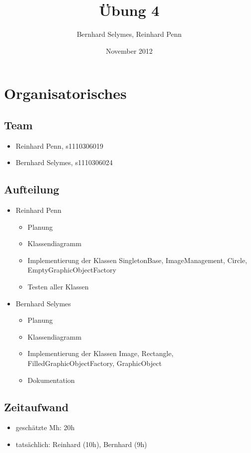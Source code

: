 \documentclass[12pt,a4paper]{article}
\begin{document}
\title{Übung 4}
\author{Bernhard Selymes, Reinhard Penn}
\date{November 2012}

\normalsize

\newcommand{\CodePath}{../ImageManagment/ImageManagment/}

\section{Organisatorisches}

\subsection{Team}
	\begin {itemize} 
		\item Reinhard Penn, s1110306019 
		\item Bernhard Selymes, s1110306024
	\end {itemize}

\subsection{Aufteilung}
	\begin {itemize} 
		\item Reinhard Penn
			\begin {itemize}
				\item Planung
				\item Klassendiagramm
				\item Implementierung der Klassen SingletonBase, ImageManagement, Circle, EmptyGraphicObjectFactory
				\item Testen aller Klassen
			\end {itemize}
		\item Bernhard Selymes
			\begin {itemize}
				\item Planung
				\item Klassendiagramm
				\item Implementierung der Klassen Image, Rectangle, FilledGraphicObjectFactory, GraphicObject
				\item Dokumentation			
			\end {itemize}
	\end {itemize}


\subsection{Zeitaufwand}
	\begin {itemize}
		\item geschätzte Mh: 20h
		\item tatsächlich: Reinhard (10h), Bernhard  (9h)
	\end {itemize}
\end{document}
